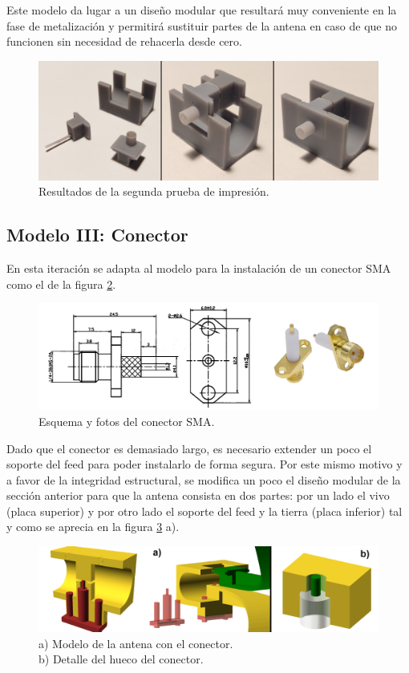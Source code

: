 \documentclass[11pt,a4paper,twoside,pdf]{article}
\numberwithin{equation}{section}
\begin{document}
Este modelo da lugar a un diseño modular que resultará muy conveniente en la fase de metalización y permitirá sustituir partes de la antena en caso de que no funcionen sin necesidad de rehacerla desde cero.
\begin{figure}[!h]
    \centering
    \includegraphics[width=0.8\linewidth]{img/modelos/2025_02_25-Ranuras/modulosPrint.png}
    \caption{Resultados de la segunda prueba de impresión.}
    \label{fig:modulosPrint}
\end{figure}

\subsection{Modelo III: Conector}

En esta iteración se adapta al modelo para la instalación de un conector SMA como el de la figura \ref{fig:esquemaConector}. 
\begin{figure}[!h]
    \centering
    \includegraphics[width=0.9\linewidth]{img/modelos/2025_03_19-ConectorV2/esquemaConector.png}
    \caption{Esquema y fotos del conector SMA.}
    \label{fig:esquemaConector}
\end{figure}

Dado que el conector es demasiado largo, es necesario extender un poco el soporte del feed para poder instalarlo de forma segura. Por este mismo motivo y a favor de la integridad estructural, se modifica un poco el diseño modular de la sección anterior para que la antena consista en dos partes: por un lado el vivo (placa superior) y por otro lado el soporte del feed y la tierra (placa inferior) tal y como se aprecia en la figura \ref{fig:soporteFeed1} a).
\begin{figure}[!h]
    \centering
    \includegraphics[width=\linewidth]{img/modelos/2025_03_19-ConectorV2/esquemaConector2.png}
    \caption{a) Modelo de la antena con el conector.\\
    b) Detalle del hueco del conector.}
    \label{fig:soporteFeed1}
\end{figure}
\end{document}
